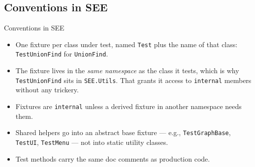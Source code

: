\subsection{Conventions in SEE}

\begin{frame}{Conventions in SEE}
  \begin{itemize}
    \item One fixture per class under test, named \texttt{Test} plus the name of
      that class: \texttt{TestUnionFind} for \texttt{UnionFind}.
    \item The fixture lives in the \emph{same namespace} as the class it tests,
      which is why \texttt{TestUnionFind} sits in \texttt{SEE.Utils}. That
      grants it access to \texttt{internal} members without any trickery.
    \item Fixtures are \texttt{internal} unless a derived fixture in another
      namespace needs them.
    \item Shared helpers go into an abstract base fixture ---
      e.g., \texttt{TestGraphBase}, \texttt{TestUI}, \texttt{TestMenu} --- not into
      static utility classes.
    \item Test methods carry the same doc comments as production code.
  \end{itemize}
  \vspace{2ex}

\end{frame}

\endinput



